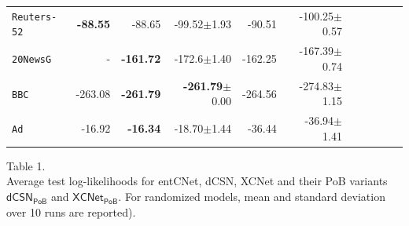\documentclass[xcolor={usenames,dvipsnames,svgnames}, compress]{beamer}
\begin{document}
\begin{frame}[t]
\begin{table}[t]
\begin{tabular}{l rrrrrrrrrr}
    \texttt{Reuters-52}   &\textbf{-88.55}&-88.65&-99.52$\pm$1.93&-90.51&-100.25$\pm$0.57\\
    \texttt{20NewsG} & - &\textbf{-161.72}&-172.6$\pm$1.40&-162.25&-167.39$\pm$0.74\\
    \texttt{BBC}          &-263.08&\textbf{-261.79}&\textbf{-261.79}$\pm$0.00&-264.56&-274.83$\pm$1.15\\
    \texttt{Ad}           &-16.92&\textbf{-16.34}&-18.70$\pm$1.44&-36.44&-36.94$\pm$1.41\\
    \bottomrule
  \end{tabular}
  \label{tab:ll-sing}
\end{table}\vspace{-10pt}\hspace{35pt}
\begin{minipage}{0.8\linewidth}
  \tiny
  \flushleft
  Table 1.\\
  Average test log-likelihoods for 
  \textsf{entCNet}, \textsf{dCSN}, \textsf{XCNet} and their
  \textsf{PoB} variants $\mathsf{dCSN_{PoB}}$ and $\mathsf{XCNet_{PoB}}$.
    For randomized models, mean and standard deviation over 10 runs are reported).
\end{minipage}
\end{frame}
\end{document}
